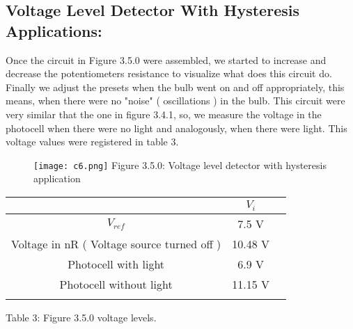 \subsection{Voltage Level Detector With Hysteresis Applications:}

Once the circuit in Figure 3.5.0 were assembled, we started to increase and decrease the potentiometers resistance to visualize what does this circuit do. Finally we adjust the presets when the bulb went on and off appropriately, this means, when there were no "noise" ( oscillations ) in the bulb. This circuit were very similar that the one in figure 3.4.1, so, we measure the voltage in the photocell when there were no light and analogously, when there were light. This voltage values were registered in table 3.

\begin{figure}[H]
\texttt{[image: c6.png]}
\centering \linebreak \linebreak Figure 3.5.0: Voltage level detector with hysteresis application
\end{figure} \hfill

\begin{center}
\begin{tabular}[.5cm]{c c c}
\toprule
\toprule
\hspace{200pt} & \hspace{100pt} $V_{i}$ \hspace{100pt}  \\
\midrule
\midrule
$V_{ref}$ & 7.5 V \\
\cmidrule{1-2}
Voltage in nR ( Voltage source turned off ) & 10.48 V \\
\cmidrule{1-2}
Photocell with light & 6.9 V \\
\cmidrule{1-2}
Photocell without light & 11.15 V \\
\bottomrule
\linebreak
\end{tabular}
\linebreak Table 3: Figure 3.5.0 voltage levels.
\end{center} \hfill

\pagebreak
